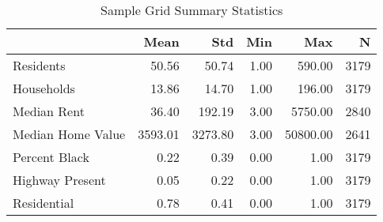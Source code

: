\begin{table}[h]
\centering
\caption{Sample Grid Summary Statistics}
\label{tab:summary_stats}
\begin{tabular*}{\linewidth}{@{\extracolsep{\fill}}l*{5}{r}}
\toprule
 & Mean & Std & Min & Max & N \\
\midrule
Residents & 50.56 & 50.74 & 1.00 & 590.00 & 3179 \\
Households & 13.86 & 14.70 & 1.00 & 196.00 & 3179 \\
Median Rent & 36.40 & 192.19 & 3.00 & 5750.00 & 2840 \\
Median Home Value & 3593.01 & 3273.80 & 3.00 & 50800.00 & 2641 \\
Percent Black & 0.22 & 0.39 & 0.00 & 1.00 & 3179 \\
Highway Present & 0.05 & 0.22 & 0.00 & 1.00 & 3179 \\
Residential & 0.78 & 0.41 & 0.00 & 1.00 & 3179 \\
\bottomrule
\end{tabular*}
\end{table}
